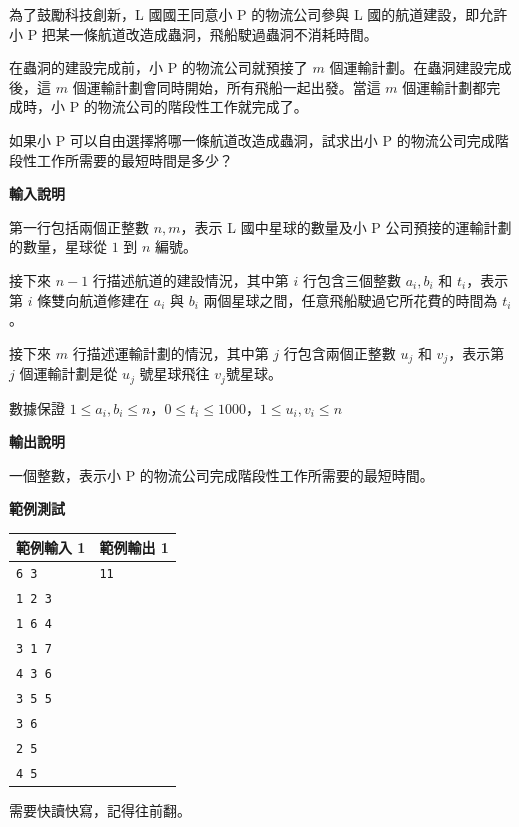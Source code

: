     為了鼓勵科技創新，L 國國王同意小 P 的物流公司參與 L 國的航道建設，即允許小 P 把某一條航道改造成蟲洞，飛船駛過蟲洞不消耗時間。

    在蟲洞的建設完成前，小 P 的物流公司就預接了 $m$ 個運輸計劃。在蟲洞建設完成後，這 $m$ 個運輸計劃會同時開始，所有飛船一起出發。當這 $m$ 個運輸計劃都完成時，小 P 的物流公司的階段性工作就完成了。

    如果小 P 可以自由選擇將哪一條航道改造成蟲洞，試求出小 P 的物流公司完成階段性工作所需要的最短時間是多少？

    \textbf{輸入說明}

    第一行包括兩個正整數 $n, m$，表示 L 國中星球的數量及小 P 公司預接的運輸計劃的數量，星球從 $1$ 到 $n$ 編號。

    接下來 $n-1$ 行描述航道的建設情況，其中第 $i$ 行包含三個整數 $a_i, b_i$ 和 $t_i$，表示第 $i$ 條雙向航道修建在 $a_i$ 與 $b_i$ 兩個星球之間，任意飛船駛過它所花費的時間為 $t_i$。

    接下來 $m$ 行描述運輸計劃的情況，其中第 $j$ 行包含兩個正整數 $u_j$ 和 $v_j$，表示第 $j$ 個運輸計劃是從 $u_j$ 號星球飛往 $v_j$號星球。

    數據保證 $1 \leq a_i,b_i \leq n$，$0 \leq t_i \leq 1000$，$1 \leq u_i,v_i \leq n$
    
    \textbf{輸出說明}

    一個整數，表示小 P 的物流公司完成階段性工作所需要的最短時間。

    \textbf{範例測試}

    \begin{tabular}{|m{7cm}|m{7cm}|}
        \hline
        範例輸入 1 & 範例輸出 1 \\
        \hline
        \verb|6 3|   & \verb|11| \\
        \verb|1 2 3| & \\
        \verb|1 6 4| & \\
        \verb|3 1 7| & \\
        \verb|4 3 6| & \\
        \verb|3 5 5| & \\
        \verb|3 6| & \\
        \verb|2 5| & \\
        \verb|4 5| & \\
        \hline
    \end{tabular}

    \begin{tip}
        需要快讀快寫，記得往前翻。
    \end{tip}